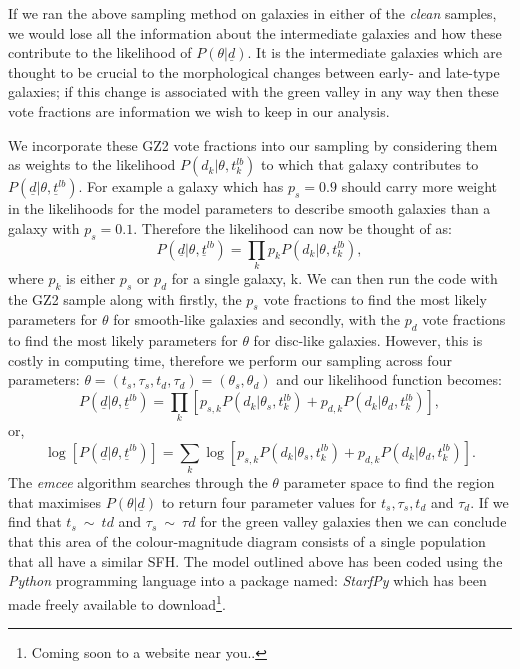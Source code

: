 \documentclass{mn2e}
\begin{document}
If we ran the above sampling method on galaxies in either of the \emph{clean} samples, we would lose all the information about the intermediate galaxies and how these contribute to the likelihood of $P(\theta|\underline{d})$. It is the intermediate galaxies which are thought to be crucial to the morphological changes between early- and late-type galaxies; if this change is associated with the green valley in any way then these vote fractions are information we wish to keep in our analysis. 

We incorporate these GZ2 vote fractions  into our sampling by considering them as weights to the likelihood $P(d_{k}|\theta, t^{lb}_{k})$ to which that galaxy contributes to $P(\underline{d}|\theta, \underline{t}^{lb})$. For example a galaxy which has $p_{s} = 0.9$ should carry more weight in the likelihoods for the model parameters to describe smooth galaxies than a galaxy with $p_{s} = 0.1$. Therefore the likelihood can now be thought of as:
\begin{equation*}
P(\underline{d}|\theta, \underline{t}^{lb}) = \prod_{k} p_{k} P(d_{k}|\theta, t_{k}^{lb}),
\end{equation*}
where $p_{k}$ is either $p_{s}$ or $p_{d}$ for a single galaxy, k. We can then run the code with the GZ2 sample along with firstly, the $p_{s}$ vote fractions to find the most likely parameters for $\theta$ for smooth-like galaxies and secondly, with the $p_{d}$ vote fractions to find the most likely parameters for $\theta$ for disc-like galaxies. However, this is costly in computing time, therefore we perform our sampling across four parameters: $\theta = (t_{s}, \tau_{s}, t_{d}, \tau_{d}) = (\theta_{s}, \theta_{d})$ and our likelihood function becomes:
\begin{equation*}
P(\underline{d}|\theta, \underline{t}^{lb}) = \prod_{k} \left [p_{s, k} P(d_{k}|\theta_{s}, t_{k}^{lb}) + p_{d, k} P(d_{k}|\theta_{d}, t_{k}^{lb}) \right],
\end{equation*}
or,
\begin{equation*}
\log \left[ P(\underline{d}|\theta, \underline{t}^{lb}) \right] = \sum_{k} \log \left [p_{s, k} P(d_{k}|\theta_{s}, t_{k}^{lb}) + p_{d, k} P(d_{k}|\theta_{d}, t_{k}^{lb}) \right]. 
\end{equation*}
The \emph{emcee} algorithm searches through the $\theta$ parameter space to find the region that maximises $P(\theta|\underline{d})$ to return four parameter values for $t_{s}, \tau_{s}, t_{d}$ and $\tau_{d}$. If we find that $t_{s}~\sim~t{d}$ and $\tau_{s} ~\sim~ \tau{d}$ for the green valley galaxies then we can conclude that this area of the colour-magnitude diagram consists of a single population that all have a similar SFH. The model outlined above has been coded using the \emph{Python} programming language into a package named: \emph{StarfPy} which has been made freely available to download\footnote{Coming soon to a website near you..}.
\end{document}
